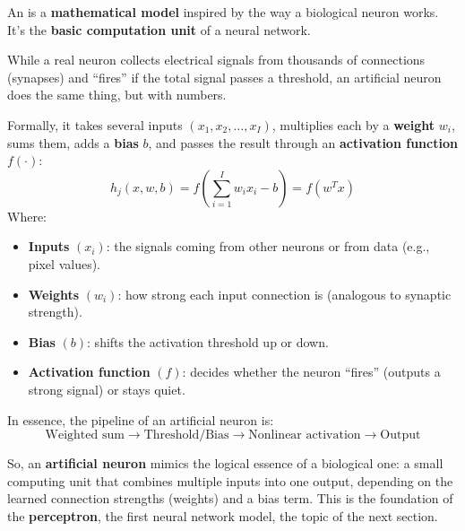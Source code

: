 \newpage

\begin{definitionbox}
    An  is a \textbf{mathematical model} inspired by the way a biological neuron works. It's the \textbf{basic computation unit} of a neural network.

    \highspace
    While a real neuron collects electrical signals from thousands of connections (synapses) and ``fires'' if the total signal passes a threshold, an artificial neuron does the same thing, but with numbers.

    \highspace
    Formally, it takes several inputs $\left(x_1, x_2, \ldots, x_I\right)$, multiplies each by a \textbf{weight} $w_i$, sums them, adds a \textbf{bias} $b$, and passes the result through an \textbf{activation function} $f(\cdot)$:
    \begin{equation}
        h_{j}\left(x, w, b\right) = f\left(\sum_{i=1}^{I} w_{i} x_{i} - b\right) = f\left(w^{T} x\right)
    \end{equation}
    Where:
    \begin{itemize}
        \item \textbf{Inputs} $\left(x_i\right)$: the signals coming from other neurons or from data (e.g., pixel values).
        \item \textbf{Weights} $\left(w_i\right)$: how strong each input connection is (analogous to synaptic strength).
        \item \textbf{Bias} $\left(b\right)$: shifts the activation threshold up or down.
        \item \textbf{Activation function} $\left(f\right)$: decides whether the neuron ``fires'' (outputs a strong signal) or stays quiet.
    \end{itemize}
    In essence, the pipeline of an artificial neuron is:
    \begin{equation*}
        \text{Weighted sum} \rightarrow \text{Threshold/Bias} \rightarrow \text{Nonlinear activation} \rightarrow \text{Output}
    \end{equation*}
\end{definitionbox}

\highspace
So, an \textbf{artificial neuron} mimics the logical essence of a biological one: a small computing unit that combines multiple inputs into one output, depending on the learned connection strengths (weights) and a bias term. This is the foundation of the \textbf{perceptron}, the first neural network model, the topic of the next section.